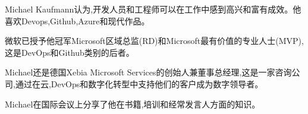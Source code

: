 Michael Kaufmann认为,开发人员和工程师可以在工作中感到高兴和富有成效。他喜欢Devops,Github,Azure和现代作品。

微软已授予他冠军Microsoft区域总监(RD)和Microsoft最有价值的专业人士(MVP),这是DevOps和Github类别的后者。

Michael还是德国Xebia Microsoft Services的创始人兼董事总经理,这是一家咨询公司,通过在云,DevOps和数字化转型中支持他们的客户成为数字领导者。

Michael在国际会议上分享了他在书籍,培训和经常发言人方面的知识。